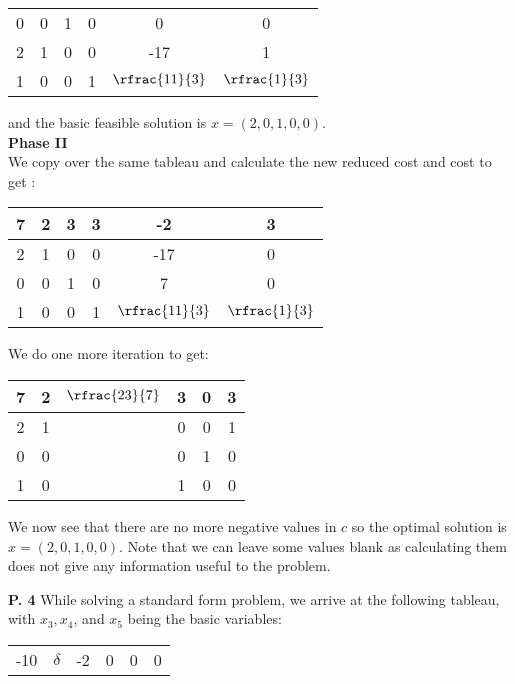 \documentclass{article}
\begin{document}
\begin{jacklist}
\begin{center}
\begin{tabular}{|c|ccccc|}
            \hline
            0&0&1&0&0&0\\
            2&1&0&0&-17&1\\
            1&0&0&1&$\rfrac{11}{3}$&$\rfrac{1}{3}$\\
            \hline
        \end{tabular}
    \end{center}
    and the basic feasible solution is $x = (2,0,1,0,0)$. \\
    \textbf{Phase II} \\
    We copy over the same tableau and calculate the new reduced cost and cost to get :
    \begin{center}
        \begin{tabular}{|c|ccccc|}
            \hline
            7&2&3&3&-2&3\\
            \hline
            2&1&0&0&-17&0\\
            0&0&1&0&7&0\\
            1&0&0&1&$\rfrac{11}{3}$&$\rfrac{1}{3}$\\
            \hline
        \end{tabular}
    \end{center}
    We do one more iteration to get:
    \begin{center}
        \begin{tabular}{|c|ccccc|}
            \hline
            7&2&$\rfrac{23}{7}$&3&0&3\\
            \hline
            2&1&&0&0&1\\
            0&0&&0&1&0\\
            1&0&&1&0&0\\
            \hline
        \end{tabular}
    \end{center}
    We now see that there are no more negative values in $c$ so the optimal solution is $x = (2,0,1,0,0)$. Note that we can leave some
    values blank as calculating them does not give any information useful to the problem. 
\newpage
    \begin{framed} 
    \item [\textbf{P. 4}] While solving a standard form problem, we arrive at the following tableau, with $x_{3}, x_{4}$, and $x_{5}$ 
        being the basic variables: 
        \begin{center}
        \begin{tabular}{|c|ccccc|}
            \hline-10 & $\delta$ & -2 & 0 & 0 & 0 \\

\end{tabular}
\end{center}
\end{framed}
\end{jacklist}
\end{document}
